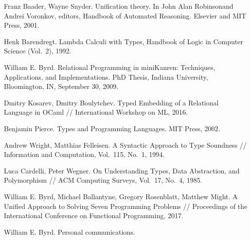 \documentclass{llncs}
\begin{document}
\begin{thebibliography}{99}
Franz Baader, Wayne Snyder. Uniﬁcation theory. In John Alan Robinsonand Andrei Voronkov, editors,
Handbook of Automated Reasoning. Elsevier and MIT Press, 2001.



Henk Barendregt. Lambda Calculi with Types, Handbook of Logic in Computer Science (Vol.~2), 1992.

William E. Byrd. Relational Programming in miniKanren: Techniques, Applications, and Implementations. PhD Thesis,
Indiana University, Bloomington, IN, September 30, 2009.

Dmitry Kosarev, Dmitry Boulytchev. Typed Embedding of a Relational Language in OCaml // International Workshop on ML, 2016.

Benjamin Pierce. Types and Programming Languages. MIT Press, 2002.

Andrew Wright, Matthias Felleisen. A Syntactic Approach to Type Soundness // Information and Computation, Vol.~115, No.~1, 1994.

Luca Cardelli, Peter Wegner. On Understanding Types, Data Abstraction, and Polymorphism // ACM Computing Surveys, Vol.~17, No.~4, 1985.

William E. Byrd, Michael Ballantyne, Gregory Rosenblatt, Matthew Might. A Unified Approach to Solving Seven Programming Problems // 
Proceedings of the International Conference on Functional Programming, 2017.

William E. Byrd. Personal communications.

\end{thebibliography}
\end{document}

